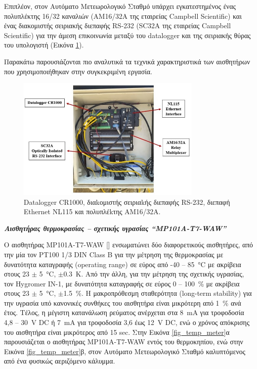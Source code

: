 \documentclass[12pt, a4paper]{report} %
\DeclareRobustCommand{\lcitep}[1]{%
  \english{[\cite{#1}]}%
}
\newcommand{\english}{\foreignlanguage{english}}
\begin{document}
Επιπλέον, στον Αυτόματο Μετεωρολογικό Σταθμό υπάρχει εγκατεστημένος ένας πολυπλέκτης 16/32 καναλιών (ΑΜ16/32A της 
εταιρείας \english{Campbell Scientific}) και ένας διακομιστής σειριακής διεπαφής \english{RS-232} (\english{SC32A} της 
εταιρείας \english{Campbell Scientific}) για την άμεση επικοινωνία μεταξύ του \english{datalogger} και της σειριακής 
θύρας του υπολογιστή (Εικόνα \ref{fig_datalogger}).

Παρακάτω παρουσιάζονται πιο αναλυτικά τα τεχνικά χαρακτηριστικά των αισθητήρων που χρησιμοποιήθηκαν στην συγκεκριμένη 
εργασία.

\begin{figure}[ht]%
    \centering
    \includegraphics[width=0.8\textwidth]{Figures/datalogger.jpg}
    \caption{\english{Datalogger CR1000}, διαkομιστής σειριαkής διεπαφής \english{RS-232}, διεπαφή \english{Ethernet NL115} και πολυπλέkτης ΑΜ16/32Α.}
    \label{fig_datalogger}
\end{figure}

\noindent \textit{\textbf{Αισθητήρας θερμοκρασίας – σχετικής υγρασίας \english{“MP101A-T7-WAW”}}}

\vspace{0.2cm}

Ο αισθητήρας \english{MP101A-T7-WAW} \lcitep{diataksi_bib2} ενσωματώνει δύο διαφορετικούς 
αισθητήρες, από την μία τον \english{PT100 1/3 DIN Class B} για την μέτρηση της θερμοκρασίας με δυνατότητα καταγραφής 
(\english{operating range}) σε εύρος από -40 – \SI{85}{\degreeCelsius} με ακρίβεια στους 23 $\pm$ \SI{5}{\degreeCelsius}, 
$\pm$\SI{0.3}{\kelvin}. Από την άλλη, για την μέτρηση της σχετικής υγρασίας, τον \english{Hygromer IN-1}, με δυνατότητα 
καταγραφής σε εύρος 0 – \SI{100}{\percent} με ακρίβεια στους 23 $\pm$ \SI{5}{\degreeCelsius}, $\pm$\SI{1,5}{\percent}. 
Η μακροπρόθεσμη σταθερότητα (\english{long-term stability}) για την υγρασία υπό κανονικές συνθήκες του αισθητήρα είναι 
μικρότερη από \SI{1}{\percent} ανά έτος. Τέλος, η μέγιστη κατανάλωση ρεύματος ανέρχεται στα \SI{8}{\milli\ampere} για 
τροφοδοσία 4,8 – \SI{30}{\volt} \english{DC} ή \SI{7}{\milli\ampere} για τροφοδοσία 3,6 έως \SI{12}{\volt} \english{DC}, 
ενώ ο χρόνος απόκρισης του αισθητήρα είναι μικρότερος από 15 \english{sec}. Στην Εικόνα \ref{fig_temp_meter}α παρουσιάζεται 
ο αισθητήρας \english{MP101A-T7-WAW} εντός του θερμοκηπίου, ενώ στην Εικόνα \ref{fig_temp_meter}β, στον Αυτόματο 
Μετεωρολογικό Σταθμό καλυπτόμενος από ένα φυσικώς αεριζόμενο κάλυμμα.
\end{document}
